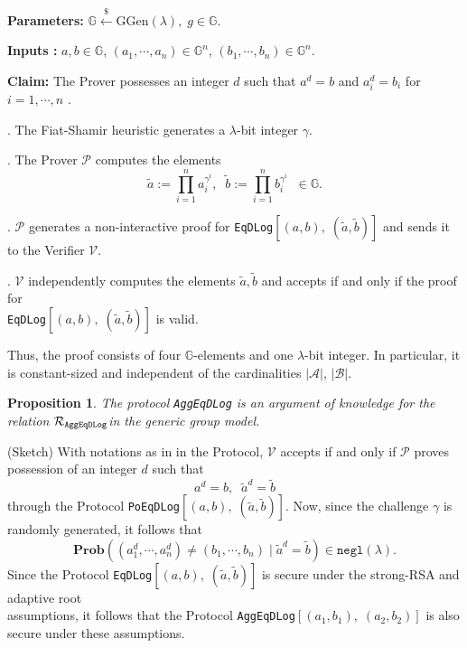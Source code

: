 \documentclass[11pt, lettersize, notitlepage, leqno, footskip=0.6cm]{article}
\newcommand{\ttt}{\texttt}
\newcommand{\negl}{\ttt{{negl}}}
\newcommand{\wti}{\widetilde}
\newcommand{\mc}{\mathcal}
\newcommand{\mb}{\mathbb}
\newcommand{\mbf}{\mathbf}
\newcommand{\mr}{\mathrm}
\newcommand{\lam}{\lambda}
\newcommand{\lamb}{\lambda}
\newcommand{\noin}{\noindent}
\newtheorem{Prop}[Thm]{Proposition}
\numberwithin{equation}{section}
\begin{document}
\noindent \textbf{Parameters:} $\mb{G}\xleftarrow{\$} \mr{GGen}(\lamb), \; g\in \mb{G}$.

\noindent \textbf{Inputs :} $a,b\in\mb{G}$, $(a_1, \cdots, a_n)\in\mb{G}^n$, $(b_1, \cdots, b_n)\in\mb{G}^n$.


\noindent \textbf{Claim:} The Prover possesses an integer $d$ such that $a^d = b$ and $a_i^d = b_i$ for $i = 1,\cdots, n$ .

\begin{prf1} . The Fiat-Shamir heuristic generates a $\lam$-bit integer $\gamma$.

. The Prover $\mc{P}$ computes the elements \vspace{-0.15cm}$$\wti{a}:= \prod\limits_{i=1}^n a_i^{\gamma^i}, \;\;\wti{b}:= \prod\limits_{i=1}^n b_i^{\gamma^i}\;\; \in \mb{G}.$$

. $\mc{P}$ generates a non-interactive proof for \verb|EqDLog|$[(a, b),\; (\wti{a}, \wti{b})]$ and sends it to the Verifier $\mc{V}$.

. $\mc{V}$ independently computes the elements $\wti{a}, \wti{b}$ and accepts if and only if the proof for\\ \verb|EqDLog|$[(a, b),\; (\wti{a}, \wti{b})]$ is valid.\end{prf1}
\vspace{0.1cm}

\noin Thus, the proof consists of four $\mb{G}$-elements and one  $\lam$-bit integer. In particular, it is constant-sized and independent of the cardinalities $|\mc{A}|$, $|\mc{B}|$.


\vspace{0.1cm}

\begin{Prop} The protocol \verb|AggEqDLog| is an argument of knowledge for the relation $\mc{R}_{{\tt{AggEqDLog}}}$in the generic group
model.\end{Prop}

\begin{prf} (Sketch) With notations as in in the Protocol, $\mc{V}$ accepts if and only if $\mc{P}$ proves possession of an integer $d$ such that $$a^d = b,\;\;\wti{a}^d = \wti{b}$$ through the Protocol \verb|PoEqDLog|$[(a,b),\; (\wti{a},\wti{b})]$. Now, since the challenge $\gamma$ is randomly generated, it follows that \vspace{-0.15cm}$$ \mbf{Prob}\left( (a_1^d,\cdots, a_n^d) \neq (b_1,\cdots, b_n)\;   \Big|\; \wti{a}^d = \wti{b} \right) \in \negl(\lamb). $$ Since the Protocol \verb|EqDLog|$[(a,b),\; (\wti{a},\wti{b})]$ is secure under the strong-RSA and adaptive root\\ assumptions, it follows that the Protocol \verb|AggEqDLog|$[(a_1, b_1),\; (a_2, b_2)]$ is also secure under these assumptions.\end{prf}
\end{document}
